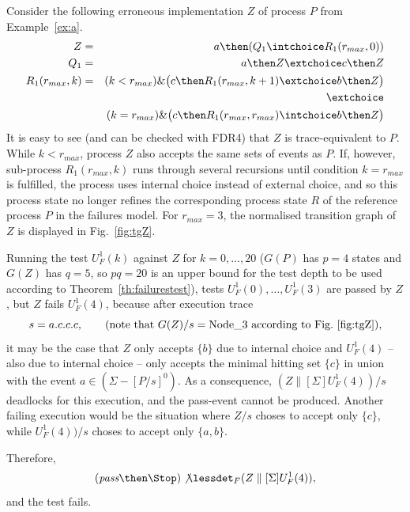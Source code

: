 \begin{example}
\label{ex:uf1tests}
Consider the following erroneous implementation $Z$ of process $P$ from Example~\ref{ex:a}.
\begin{eqnarray*}
Z & = & a \then (Q_1 \intchoice R_1(r_{max},0))
\\
Q_1 & = & a\then Z \extchoice c\then Z
\\
R_1(r_{max},k) & = & (k < r_{max}) \& \big( c\then R_1(r_{max},k+1)\extchoice b\then Z  \big)
\\ & & \extchoice
\\ & & (k = r_{max}) \& \big( c\then R_1(r_{max},r_{max})\intchoice b\then Z  \big)
\end{eqnarray*}
It is easy to see (and can be checked with FDR4) that $Z$ is trace-equivalent to $P$. While $k < r_{max}$, process $Z$ also accepts the same sets of events as $P$. If, however,
sub-process $R_1(r_{max},k)$ runs through several recursions until condition 
$k = r_{max}$ is fulfilled, the process uses internal choice instead of external choice, and so this process state   no longer refines   the corresponding process state $R$ of the reference process $P$ in the failures model. For $r_{max} = 3$,   the
normalised transition graph of $Z$ is displayed in Fig.~\ref{fig:tgZ}.

Running the test $U_F^1(k)$ against $Z$ for $k=0,\dots,20$ ($G(P)$ has $p = 4$ states
and $G(Z)$ has $q=5$, so $pq=20$ is an upper bound for the test depth to be used 
according to Theorem~\ref{th:failurestest}), tests $U_F^1(0),\dots, U_F^1(3)$ are passed by $Z$, but $Z$ fails $U_F^1(4)$, because after  execution trace
\[
s = a.c.c.c, \qquad\text{(note that $G(Z)/s = \text{Node\_3}$ according to Fig.~\ref{fig:tgZ})},
\]
it may be the case that   $Z$  
only accepts $\{b\}$ due to internal choice and $U_F^1(4)$ 
-- also due to internal choice -- 
only accepts
the minimal hitting set $\{ c \}$ in union with the event $a\in (\Sigma - [P/s]^0)$. 
As
a consequence, $(Z\parallel[\Sigma] U_F^1(4))/s$ deadlocks for this execution, 
and the pass-event cannot be
produced. Another failing execution would be the situation where $Z/s$ choses to
accept only $\{c \}$, while $U_F^1(4))/s$ choses to accept only $\{a,b\}$.

Therefore, 
\[
(\epass\then \Stop)\not\lessdet_F  (Z\parallel[\Sigma] U_F^1(4)),
\]
and the test fails.
\xbox
\end{example}
 
 


